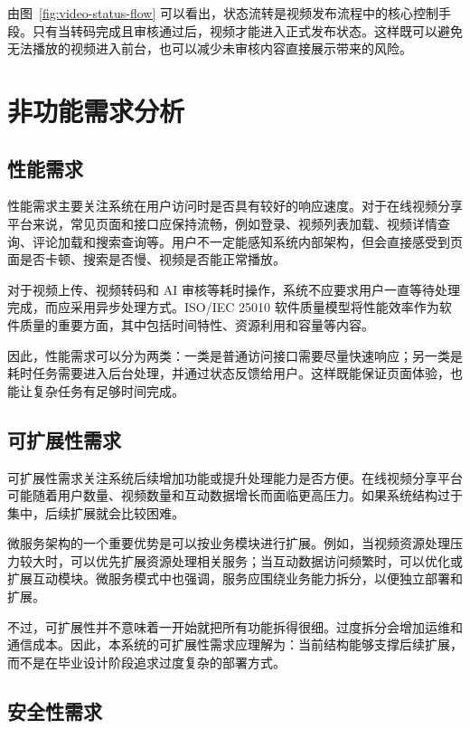 由图~\ref{fig:video-status-flow} 可以看出，状态流转是视频发布流程中的核心控制手段。只有当转码完成且审核通过后，视频才能进入正式发布状态。这样既可以避免无法播放的视频进入前台，也可以减少未审核内容直接展示带来的风险。

\section{非功能需求分析}
\label{sec:non-functional-requirements}

\subsection{性能需求}
\label{subsec:performance-requirements}

性能需求主要关注系统在用户访问时是否具有较好的响应速度。对于在线视频分享平台来说，常见页面和接口应保持流畅，例如登录、视频列表加载、视频详情查询、评论加载和搜索查询等。用户不一定能感知系统内部架构，但会直接感受到页面是否卡顿、搜索是否慢、视频是否能正常播放。

对于视频上传、视频转码和 AI 审核等耗时操作，系统不应要求用户一直等待处理完成，而应采用异步处理方式。ISO/IEC 25010 软件质量模型将性能效率作为软件质量的重要方面，其中包括时间特性、资源利用和容量等内容\cite{iso25010}。

因此，性能需求可以分为两类：一类是普通访问接口需要尽量快速响应；另一类是耗时任务需要进入后台处理，并通过状态反馈给用户。这样既能保证页面体验，也能让复杂任务有足够时间完成。

\subsection{可扩展性需求}
\label{subsec:scalability-requirements}

可扩展性需求关注系统后续增加功能或提升处理能力是否方便。在线视频分享平台可能随着用户数量、视频数量和互动数据增长而面临更高压力。如果系统结构过于集中，后续扩展就会比较困难。

微服务架构的一个重要优势是可以按业务模块进行扩展。例如，当视频资源处理压力较大时，可以优先扩展资源处理相关服务；当互动数据访问频繁时，可以优化或扩展互动模块。微服务模式中也强调，服务应围绕业务能力拆分，以便独立部署和扩展\cite{richardson2018microservices}。

不过，可扩展性并不意味着一开始就把所有功能拆得很细。过度拆分会增加运维和通信成本。因此，本系统的可扩展性需求应理解为：当前结构能够支撑后续扩展，而不是在毕业设计阶段追求过度复杂的部署方式。

\subsection{安全性需求}
\label{subsec:security-requirements}


